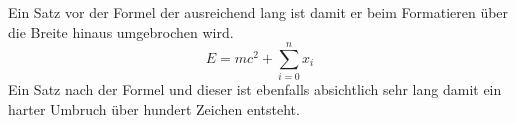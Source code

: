 Ein Satz vor der Formel der ausreichend lang ist damit er beim Formatieren über die Breite hinaus umgebrochen wird.
\[
E = mc^2 + \sum_{i=0}^{n} x_i
\]
Ein Satz nach der Formel und dieser ist ebenfalls absichtlich sehr lang damit ein harter Umbruch über hundert Zeichen entsteht.
